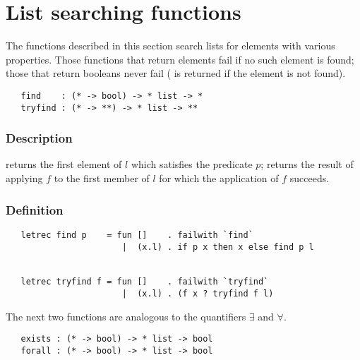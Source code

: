 \section{List searching functions}

The functions described in this section search lists for elements with various
properties. Those functions that return elements fail if no 
such element is found;
those that return booleans never fail ( is returned 
if the element is not found).

\begin{boxed}
\begin{verbatim}
   find    : (* -> bool) -> * list -> *
   tryfind : (* -> **) -> * list -> **
\end{verbatim}\end{boxed}

\subsubsection*{Description}

 returns the first element of $l$ which 
satisfies the predicate
$p$;  returns the result of applying 
$f$ to the first member
of $l$ for which the application of $f$ succeeds.

\subsubsection*{Definition}

\begin{hol}\begin{verbatim}
   letrec find p    = fun []    . failwith `find`
                       |  (x.l) . if p x then x else find p l


   letrec tryfind f = fun []    . failwith `tryfind`
                       |  (x.l) . (f x ? tryfind f l)
\end{verbatim}\end{hol}


\noindent The next two functions are analogous to the quantifiers $\exists$ and
$\forall$.

\begin{boxed}
\begin{verbatim}
   exists : (* -> bool) -> * list -> bool
   forall : (* -> bool) -> * list -> bool
\end{verbatim}\end{boxed}

